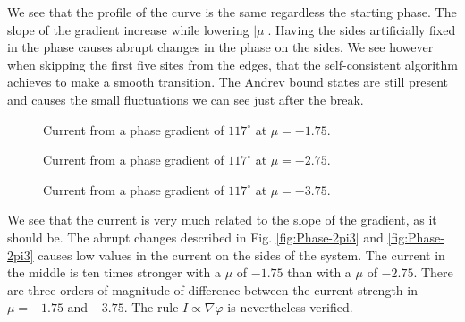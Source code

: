 \documentclass[..\main.tex]{subfile}
\begin{document}
We see that the profile of the curve is the same regardless the starting phase. The slope of the gradient increase while lowering $|\mu|$.
Having the sides artificially fixed in the phase causes abrupt changes in the phase on the sides. We see however when skipping the first
 five sites from the edges, that the self-consistent
algorithm achieves to make a smooth transition. The Andrev bound states are still present and causes the small fluctuations we can see just after the
break.\\
\begin{figure}[H]
    
    \caption{Current from a phase gradient of $117^{\circ}$ at $\mu = -1.75$.}
\end{figure}
\begin{figure}[H]
    
    \caption{Current from a phase gradient of $117^{\circ}$ at $\mu = -2.75$.}
\end{figure}
\begin{figure}[H]
    
    \caption{Current from a phase gradient of $117^{\circ}$ at $\mu = -3.75$.}
\end{figure}

We see that the current is very much related to the slope of the gradient, as it should be. 
The abrupt changes described in Fig. \ref{fig:Phase-2pi3} and \ref{fig:Phase-2pi3} causes low values in the current on the sides of the system. 
The current in the middle is ten times stronger with a $\mu$ of $-1.75$ than with a $\mu$ of $-2.75$. There are three orders of magnitude
of difference between the current strength in $\mu = -1.75$ and $-3.75$. The rule $I\propto\nabla\varphi$ is nevertheless verified.\\
\end{document}

